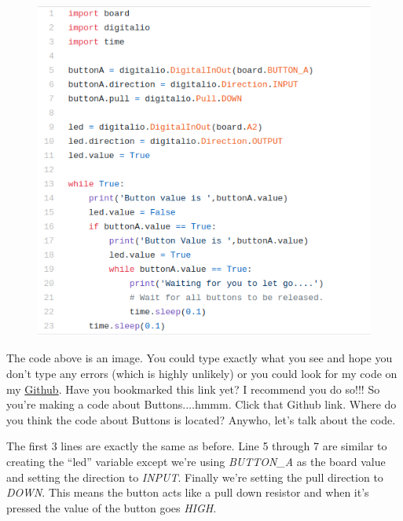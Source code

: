 \begin{figure}[H]
  \begin{center}
    \includegraphics[width=\textwidth]{Figures/button_blink.png}
  \end{center}
\end{figure}
The code above is an image. You could type exactly what you see and
hope you don't type any errors (which is highly unlikely) or you could
look for my code on my
\href{https://github.com/cmontalvo251/Microcontrollers/tree/master/Circuit_Playground/CircuitPython}{Github}. Have
you bookmarked this link yet? I recommend you do so!!! So you're
making a code about Buttons....hmmm. Click that Github link. Where do
you think the code about Buttons is located? Anywho, let's talk about
the code.

The first 3 lines are exactly the same as before. Line 5 through 7 are
similar to creating the “led” variable except we’re using {\it BUTTON\_A} as
the board value and setting the direction to {\it INPUT}. Finally we’re
setting the pull direction to {\it DOWN}. This means the button acts like a
pull down resistor and when it’s pressed the value of the button goes
{\it HIGH}.

